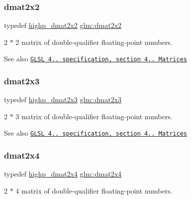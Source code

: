 \subsubsection{\texorpdfstring{dmat2x2}{dmat2x2}}
{\footnotesize\ttfamily typedef \hyperlink{group__core__precision_gad08aec6bf6b5ae7d486fbabb3b28f904}{highp\+\_\+dmat2x2} \hyperlink{group__core__types_gae9932771e11a4f38e21f1136423bab18}{glm\+::dmat2x2}}

2 $\ast$ 2 matrix of double-\/qualifier floating-\/point numbers.

\begin{DoxySeeAlso}{See also}
\href{http://www.opengl.org/registry/doc/GLSLangSpec.4.20.8.pdf}{\tt G\+L\+SL 4.. specification, section 4.. Matrices} 
\end{DoxySeeAlso}
\mbox{\label{group__core__types_ga6b5ff9888ca0e468f35b637d4c3a361d}} 
\subsubsection{\texorpdfstring{dmat2x3}{dmat2x3}}
{\footnotesize\ttfamily typedef \hyperlink{group__core__precision_gad7de433cb7f79959a191fc5c64fbfc4e}{highp\+\_\+dmat2x3} \hyperlink{group__core__types_ga6b5ff9888ca0e468f35b637d4c3a361d}{glm\+::dmat2x3}}

2 $\ast$ 3 matrix of double-\/qualifier floating-\/point numbers.

\begin{DoxySeeAlso}{See also}
\href{http://www.opengl.org/registry/doc/GLSLangSpec.4.20.8.pdf}{\tt G\+L\+SL 4.. specification, section 4.. Matrices} 
\end{DoxySeeAlso}
\mbox{\label{group__core__types_ga2d1dd4b4925d1ea67539902c820483a0}} 
\subsubsection{\texorpdfstring{dmat2x4}{dmat2x4}}
{\footnotesize\ttfamily typedef \hyperlink{group__core__precision_gaea7c625705d849f1a55c9bfcb2585875}{highp\+\_\+dmat2x4} \hyperlink{group__core__types_ga2d1dd4b4925d1ea67539902c820483a0}{glm\+::dmat2x4}}

2 $\ast$ 4 matrix of double-\/qualifier floating-\/point numbers.


